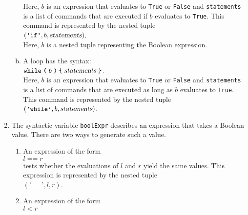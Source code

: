 \begin{enumerate}
\begin{enumerate}[(a)]
            Here, $b$ is an expression that evaluates to \texttt{True} or \texttt{False}
            and \texttt{statements} is a list of commands that are executed if
            $b$ evaluates to \texttt{True}.
            This command is represented by the nested tuple
            \\[0.2cm]
            \hspace*{1.3cm}
            $(\texttt{'if'}, b, \textsl{statements})$.
            \\[0.2cm]
            Here, $b$ is a nested tuple representing the Boolean expression.
      \item A loop has the syntax:
            \\[0.2cm]
            \hspace*{1.3cm}
            $\texttt{while}\; \texttt{(}\; b\; \texttt{)}\; \texttt{\{}\; \textsl{statements}\; \texttt{\}}$.
            \\[0.2cm]
            Here, $b$ is an expression that evaluates to \texttt{True} or \texttt{False}
            and \texttt{statements} is a list of commands that are executed as long as
            $b$ evaluates to \texttt{True}.
            This command is represented by the nested tuple
            \\[0.2cm]
            \hspace*{1.3cm}
            $(\texttt{'while'}, b, \textsl{statements})$.
      \end{enumerate}
\item The syntactic variable \texttt{boolExpr} describes an expression that takes a Boolean value.
      There are two ways to generate such a value.
      \begin{enumerate}
      \item An expression of the form
            \\[0.2cm]
            \hspace*{1.3cm}
            $l \;\texttt{==}\; r $
            \\[0.2cm]
            tests whether the evaluations of $l$ and $r$ yield the same values.
            This expression is represented by the nested tuple
            \\[0.2cm]
            \hspace*{1.3cm}
            $(\texttt{'=='}, l, r)$.
      \item An expression of the form
            \\[0.2cm]
            \hspace*{1.3cm}
            $l \;\texttt{<}\; r $

\end{enumerate}
\end{enumerate}
